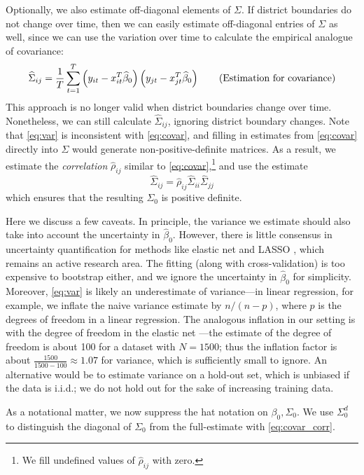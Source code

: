 \documentclass[11pt]{article}
\begin{document}
Optionally, we also estimate off-diagonal elements of $\Sigma$. If district boundaries do not change over time, then we can easily estimate off-diagonal entries of $\Sigma$ as well, since we can use the variation over time to calculate the empirical analogue of covariance: \[
\widehat \Sigma_{ij} = \frac{1}{T}\sum_{t=1}^T \left({y_{it} -x_{it}^T \widehat \beta_0}\right)\left({y_{jt} -x_{jt}^T \widehat \beta_0}\right) \tag{Estimation for covariance}
\label{eq:covar}
\]
This approach is no longer valid when district boundaries change over time. Nonetheless, we can still calculate $\hat \Sigma_{ij}$, ignoring district boundary changes.  Note that \eqref{eq:var} is inconsistent with \eqref{eq:covar}, and filling in estimates from \eqref{eq:covar} directly into $\Sigma$ would generate non-positive-definite matrices. As a result, we estimate the \emph{correlation} $\hat \rho_{ij}$ similar to \eqref{eq:covar},\footnote{We fill undefined values of $\hat \rho_{ij}$ with zero.} and use the estimate 
 \[
\hat \Sigma_{ij} = \hat \rho_{ij} \hat \Sigma_{ii} \hat \Sigma_{jj}
 \tag{Estimation for covariance with correlation}
\label{eq:covar_corr}
\]
which ensures that the resulting $\Sigma_0$ is positive definite. 

Here we discuss a few caveats. In principle, the variance we estimate should also take into account the uncertainty in $\hat \beta_0$. However, there is little consensus in uncertainty quantification for methods like elastic net and LASSO \citep{kyung2010penalized}, which remains an active research area. The fitting (along with cross-validation) is too expensive to bootstrap either, and we ignore the uncertainty in $\hat \beta_0$ for simplicity. Moreover, \eqref{eq:var} is likely an underestimate of variance---in linear regression, for example, we inflate the naive variance estimate by $n/(n-p)$, where $p$ is the degrees of freedom in a linear regression. The analogous inflation in our setting is with the degree of freedom in the elastic net \citep{zou2007degrees}---the estimate of the degree of freedom is about 100 for a dataset with $N=1500$; thus the inflation factor is about $\frac{1500}{1500-100} \approx 1.07$ for variance, which is sufficiently small to ignore. An alternative would be to estimate variance on a hold-out set, which is unbiased if the data is i.i.d.; we do not hold out for the sake of increasing training data.  

As a notational matter, we now suppress the hat notation on $\beta_0, \Sigma_0.$ We use $\Sigma_0^d$ to distinguish the diagonal of $\Sigma_0$ from the full-estimate with \eqref{eq:covar_corr}. 
\end{document}
